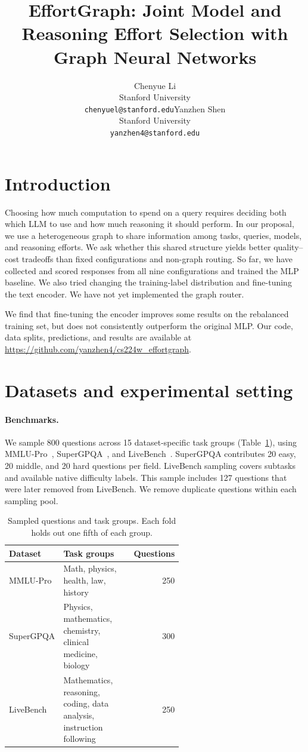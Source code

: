 \documentclass{article}
\title{EffortGraph: Joint Model and Reasoning Effort Selection with Graph Neural Networks}
\author{Chenyue Li\\Stanford University\\\texttt{chenyuel@stanford.edu}\And Yanzhen Shen\\Stanford University\\\texttt{yanzhen4@stanford.edu}}
\begin{document}
\maketitle

\section{Introduction}
Choosing how much computation to spend on a query requires deciding both which LLM to use and how much reasoning it should perform. In our proposal, we use a heterogeneous graph to share information among tasks, queries, models, and reasoning efforts. We ask whether this shared structure yields better quality--cost tradeoffs than fixed configurations and non-graph routing. So far, we have collected and scored responses from all nine configurations and trained the MLP baseline. We also tried changing the training-label distribution and fine-tuning the text encoder. We have not yet implemented the graph router.

We find that fine-tuning the encoder improves some results on the rebalanced training set, but does not consistently outperform the original MLP. Our code, data splits, predictions, and results are available at \url{https://github.com/yanzhen4/cs224w_effortgraph}.

\section{Datasets and experimental setting}
\paragraph{Benchmarks.} We sample 800 questions across 15 dataset-specific task groups (Table~\ref{tab:data}), using MMLU-Pro~\cite{mmlu}, SuperGPQA~\cite{supergpqa}, and LiveBench~\cite{livebench}. SuperGPQA contributes 20 easy, 20 middle, and 20 hard questions per field. LiveBench sampling covers subtasks and available native difficulty labels. This sample includes 127 questions that were later removed from LiveBench. We remove duplicate questions within each sampling pool.
\begin{table}[h]
\centering\small
\caption{Sampled questions and task groups. Each fold holds out one fifth of each group.}\label{tab:data}
\begin{tabular}{lp{0.58\linewidth}r}
\toprule
Dataset & Task groups & Questions\\
\midrule
MMLU-Pro & Math, physics, health, law, history & 250\\
SuperGPQA & Physics, mathematics, chemistry, clinical medicine, biology & 300\\
LiveBench & Mathematics, reasoning, coding, data analysis, instruction following & 250\\
\bottomrule
\end{tabular}
\end{table}
\end{document}
